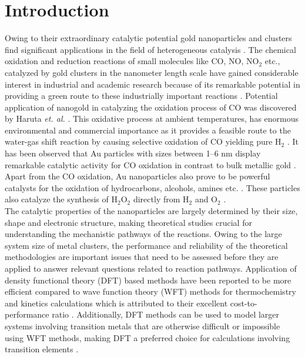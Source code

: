 \section{Introduction}
Owing to their extraordinary catalytic potential gold nanoparticles and clusters find significant applications in the field of heterogeneous catalysis \cite{haruta1987,Olga2010}. The chemical oxidation and reduction reactions of small molecules like CO, NO, NO$_2$ etc., catalyzed by gold clusters in the nanometer length scale have gained considerable interest in industrial and academic research because of its remarkable potential in providing a green route to these industrially important reactions \cite{stratakis2012catalysis}. Potential application of nanogold in catalyzing the oxidation process of CO was discovered by Haruta \textit{et. al.} \cite{haruta1987,hashmi2006}. This oxidative process at ambient temperatures, has enormous environmental and commercial importance as it provides a feasible route to the water-gas shift reaction by causing selective oxidation of CO yielding pure H$_2$ \cite{stratakis2012catalysis,okumura2004vital,weiher2007activation}.
It has been observed that Au particles with sizes between 1--6 nm display remarkable catalytic activity for CO oxidation in contrast to bulk metallic gold \cite{Haruta1997,Valden1998,meerson2005}. Apart from the CO oxidation, Au nanoparticles also prove to be powerful catalysts for the oxidation of hydrocarbons, alcohols, amines etc. \cite{della2008selective,della2012update}. These particles also catalyze the synthesis of H$_2$O$_2$ directly from H$_2$ and O$_2$ \cite{hutchings2008nanocrystalline,edwards2013effect,edwards2009switching}.\\
The catalytic properties of the nanoparticles are largely determined by their size, shape and electronic structure, making theoretical studies crucial for understanding the mechanistic pathways of the reactions. Owing to the large system size of metal clusters, the performance and reliability of the theoretical methodologies are important issues that need to be assessed before they are applied to answer relevant questions related to reaction pathways. Application of density functional theory (DFT) based methods have been reported to be more efficient compared to wave function theory (WFT) methods for thermochemistry and kinetics calculations which is attributed to their excellent cost-to-performance ratio \cite{zhao2005}. Additionally, DFT methods can be used to model larger systems involving transition metals that are otherwise difficult or impossible using WFT methods, making  DFT a preferred choice for calculations involving transition elements \cite{ricca1995comparison,siegbahn2006modeling,zhao2008density,cramer2009density}.\\ 
